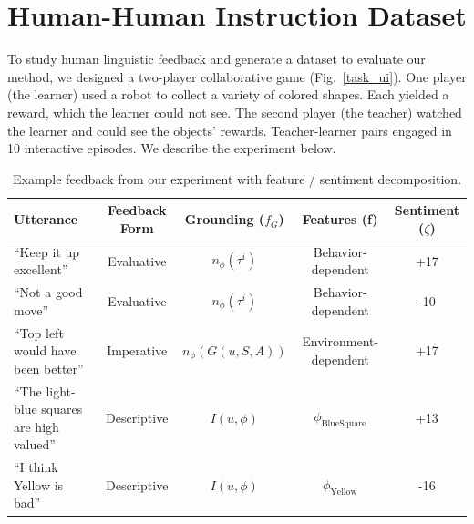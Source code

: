 \documentclass[letterpaper]{article} %
\begin{document}
\section{Human-Human Instruction Dataset}
\label{experiment_section}

To study human linguistic feedback and generate a dataset to evaluate our method, we designed a two-player collaborative game (Fig.~\ref{task_ui}). One player (the learner) used a robot to collect a variety of colored shapes. Each yielded a reward, which the learner could not see. The second player (the teacher) watched the learner and could see the objects' rewards. Teacher-learner pairs engaged in 10 interactive episodes. We describe the experiment below.

\begin{table}[h]
\begin{center}
\vskip 0.12in
\begin{tabular}{lcccc}
\hline
Utterance   &  Feedback Form & Grounding ($f_G$) & Features (\textbf{f}) & Sentiment ($\zeta$)  \\
\hline
``Keep it up excellent'' & Evaluative & $n_\phi(\tau^i)$ & Behavior-dependent  & +17 \\
``Not a good move''  & Evaluative &  $n_\phi(\tau^i)$ & Behavior-dependent  & -10 \\
``Top left would have been better''  &  Imperative & $n_\phi(G(u, S, A))$ & Environment-dependent & +17 \\
``The light-blue squares are high valued'' & Descriptive & $I(u, \phi)$ & $\phi_{\text{BlueSquare}}$ & +13  \\
``I think Yellow is bad'' & Descriptive &  $I(u, \phi)$ & $\phi_\text{Yellow}$ & -16 \\
\hline
\end{tabular}
\caption{Example feedback from our experiment with feature / sentiment decomposition.}
\label{tab:experiment_language_example}
\end{center}
\end{table}
\end{document}
